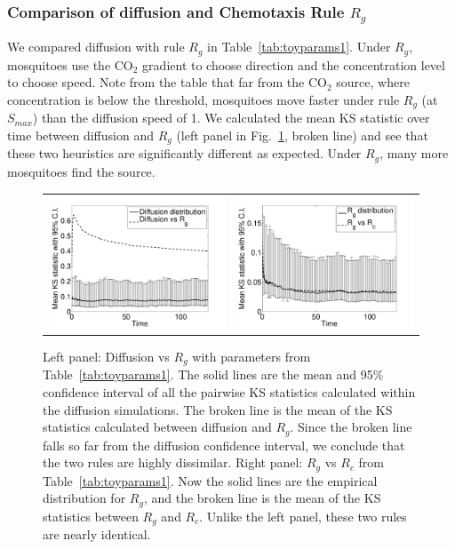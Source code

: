 \documentclass[12pt]{article}
\newcommand{\mycaption}[1]{\caption{#1}}
\begin{document}
\subsubsection{Comparison of diffusion and Chemotaxis Rule $R_g$}
We compared diffusion with rule $R_g$ in Table~\ref{tab:toyparams1}. Under $R_g$, mosquitoes use the CO$_2$ gradient to choose direction and the concentration level to choose speed. Note from the table that far from the CO$_2$
source, where concentration is below the threshold, mosquitoes move faster under rule $R_g$
(at $S_{max}$) than the diffusion speed of 1.
We calculated the mean KS statistic over time between diffusion and $R_g$ (left panel in Fig.~\ref{fig:diffcomp}, broken line) and see that these two heuristics are significantly different as expected. Under $R_g$, many more mosquitoes find the source.
		
\begin{figure}[hbtp]
	\begin{center}
		\begin{tabular}{cc}
		\includegraphics[width=3.25in]{figures/DiffusionvsRg.pdf} & \includegraphics[width=3.25in]{figures/RgvsRc.pdf}
	\end{tabular}
	\end{center}
	\mycaption{Left panel: Diffusion vs $R_g$ with parameters from Table~\ref{tab:toyparams1}. The solid lines are the mean and 95\% confidence interval of all the pairwise KS statistics calculated within the diffusion simulations. The broken line is the mean of the KS statistics calculated between diffusion and $R_g$. Since the broken line falls so far from the diffusion confidence interval, we conclude that the two rules are highly dissimilar. Right panel: $R_g$ vs $R_c$ from Table~\ref{tab:toyparams1}. Now the solid lines are the empirical distribution for $R_g$, and the broken line is the mean of the KS statistics between $R_g$ and $R_c$. Unlike the left panel, these two rules are nearly identical.}\label{fig:diffcomp}
\end{figure}
\end{document}
